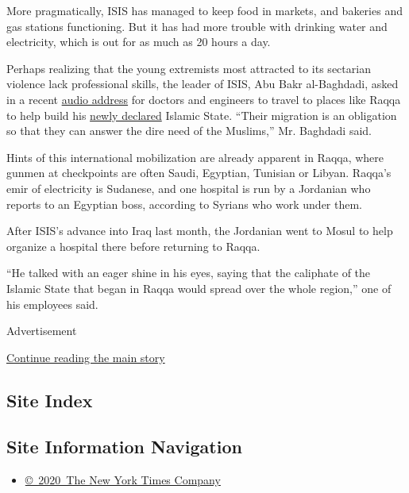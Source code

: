 More pragmatically, ISIS has managed to keep food in markets, and
bakeries and gas stations functioning. But it has had more trouble with
drinking water and electricity, which is out for as much as 20 hours a
day.

Perhaps realizing that the young extremists most attracted to its
sectarian violence lack professional skills, the leader of ISIS, Abu
Bakr al-Baghdadi, asked in a recent
\href{https://pietervanostaeyen.wordpress.com/2014/07/01/islamic-state-message-to-the-mujahidin-and-the-islamic-ummah-in-the-month-of-ramadan/}{audio
address} for doctors and engineers to travel to places like Raqqa to
help build his
\href{http://www.nytimes.com/2014/07/06/world/asia/iraq-abu-bakr-al-baghdadi-sermon-video.html?_r=0}{newly
declared} Islamic State. ``Their migration is an obligation so that they
can answer the dire need of the Muslims,'' Mr. Baghdadi said.

Hints of this international mobilization are already apparent in Raqqa,
where gunmen at checkpoints are often Saudi, Egyptian, Tunisian or
Libyan. Raqqa's emir of electricity is Sudanese, and one hospital is run
by a Jordanian who reports to an Egyptian boss, according to Syrians who
work under them.

After ISIS's advance into Iraq last month, the Jordanian went to Mosul
to help organize a hospital there before returning to Raqqa.

``He talked with an eager shine in his eyes, saying that the caliphate
of the Islamic State that began in Raqqa would spread over the whole
region,'' one of his employees said.

Advertisement

\protect\hyperlink{after-bottom}{Continue reading the main story}

\hypertarget{site-index}{%
\subsection{Site Index}\label{site-index}}

\hypertarget{site-information-navigation}{%
\subsection{Site Information
Navigation}\label{site-information-navigation}}

\begin{itemize}
\tightlist
\item
  \href{https://help.nytimes.com/hc/en-us/articles/115014792127-Copyright-notice}{©~2020~The
  New York Times Company}
\end{itemize}

